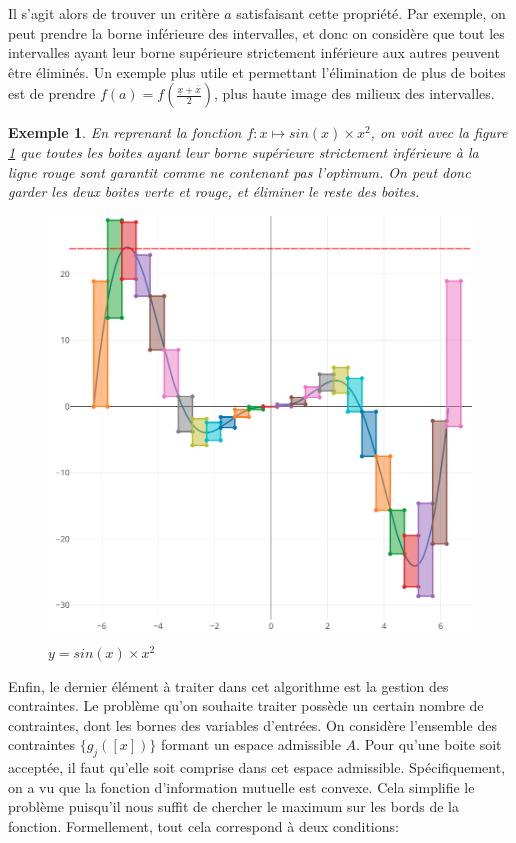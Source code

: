 \documentclass[12pt,a4paper]{article}
\newtheorem{ex}{Exemple}
\begin{document}
    Il s'agit alors de trouver un critère $a$ satisfaisant cette propriété. Par exemple, on peut prendre la borne inférieure des intervalles, et donc on considère que tout les intervalles ayant leur borne supérieure strictement inférieure aux autres peuvent être éliminés. Un exemple plus utile et permettant l'élimination de plus de boites est de prendre $f(a) = f(\frac{\underline{x} + \overline{x}}{2})$, plus haute image des milieux des intervalles.

    \begin{ex}
        En reprenant la fonction $f : x \mapsto sin(x)\times x^2$, on voit avec la figure \ref{fig:sinx_sqrx_optim} que toutes les boites ayant leur borne supérieure strictement inférieure à la ligne rouge sont garantit comme ne contenant pas l'optimum. On peut donc garder les deux boites verte et rouge, et éliminer le reste des boites.

        \begin{figure}[h]
            \centering
            \includegraphics[scale=0.2]{sinx_sqrx_optim.png}
            \caption{$y = sin(x) \times x^2$}
            \label{fig:sinx_sqrx_optim}
        \end{figure}
    \end{ex}

    Enfin, le dernier élément à traiter dans cet algorithme est la gestion des contraintes. Le problème qu'on souhaite traiter possède un certain nombre de contraintes, dont les bornes des variables d'entrées. On considère l'ensemble des contraintes $\{g_j([x])\}$ formant un espace admissible $A$. Pour qu'une boite soit acceptée, il faut qu'elle soit comprise dans cet espace admissible. Spécifiquement, on a vu que la fonction d'information mutuelle est convexe. Cela simplifie le problème puisqu'il nous suffit de chercher le maximum sur les bords de la fonction. Formellement, tout cela correspond à deux conditions:
\end{document}

